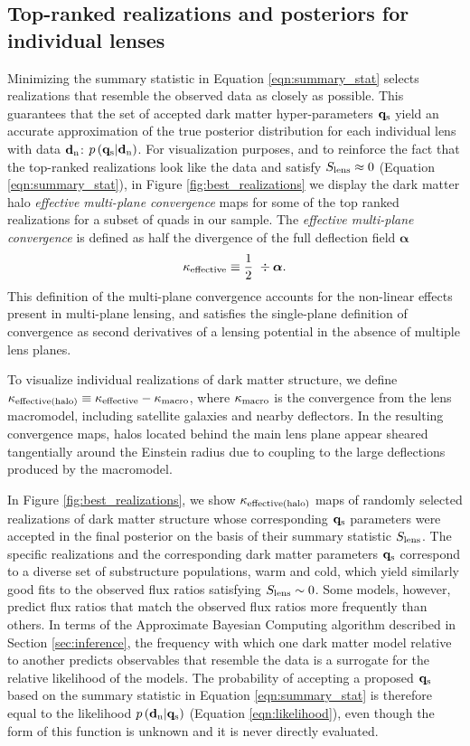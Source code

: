 \subsection{Top-ranked realizations and posteriors for individual lenses}
\label{ssec:jointinf}
Minimizing the summary statistic in Equation \ref{eqn:summary_stat} selects realizations that resemble the observed data as closely as possible. This guarantees that the set of accepted dark matter hyper-parameters ${\bf{q}_{\rm{s}}}$ yield an accurate approximation of the true posterior distribution for each individual lens with data ${\bf{d}_{\rm{n}}}$: $p\left({\bf{q}_{\rm{s}}} | {\bf{d}_{\rm{n}}}\right)$. For visualization purposes, and to reinforce the fact that the top-ranked realizations look like the data and satisfy $S_{\rm{lens}} \approx 0$ (Equation \ref{eqn:summary_stat}), in Figure \ref{fig:best_realizations} we display the dark matter halo \textit{effective multi-plane convergence} maps for some of the top ranked realizations for a subset of quads in our sample. The \textit{effective multi-plane convergence} is defined as half the divergence of the full deflection field $\boldsymbol{\alpha}$
\begin{equation}
\label{eqn:kappaeff}
\kappa_{\rm{effective}}  \equiv \frac{1}{2} \ \div{ \boldsymbol{\alpha}}.
\end{equation}
This definition of the multi-plane convergence accounts for the non-linear effects present in multi-plane lensing, and satisfies the single-plane definition of convergence as second derivatives of a lensing potential in the absence of multiple lens planes. 

To visualize individual realizations of dark matter structure, we define $\kappa_{\rm{effective(halo)}} \equiv \kappa_{\rm{effective}} - \kappa_{\rm{macro}}$, where $\kappa_{\rm{macro}}$ is the convergence from the lens macromodel, including satellite galaxies and nearby deflectors. In the resulting convergence maps, halos located behind the main lens plane appear sheared tangentially around the Einstein radius due to coupling to the large deflections produced by the macromodel. 

In Figure \ref{fig:best_realizations}, we show $\kappa_{\rm{effective(halo)}}$ maps of randomly selected realizations of dark matter structure whose corresponding ${\bf{q}_{\rm{s}}}$ parameters were accepted in the final posterior on the basis of their summary statistic $S_{\rm{lens}}$. The specific realizations and the corresponding dark matter parameters ${\bf{q}_{\rm{s}}}$ correspond to a diverse set of substructure populations, warm and cold, which yield similarly good fits to the observed flux ratios satisfying $S_{\rm{lens}} \sim 0$. Some models, however, predict flux ratios that match the observed flux ratios more frequently than others. In terms of the Approximate Bayesian Computing algorithm described in Section \ref{sec:inference}, the frequency with which one dark matter model relative to another predicts observables that resemble the data is a surrogate for the relative likelihood of the models. The probability of accepting a proposed ${\bf{q}_{\rm{s}}}$ based on the summary statistic in Equation \ref{eqn:summary_stat} is therefore equal to the likelihood $p\left({\bf{d}_{\rm{n}}} | {\bf{q}_{\rm{s}}}\right)$ (Equation \ref{eqn:likelihood}), even though the form of this function is unknown and it is never directly evaluated. 

